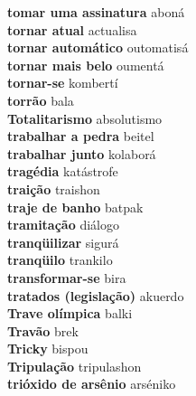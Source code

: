 \textbf{ tomar uma assinatura  } aboná \\
\textbf{ tornar atual  } actualisa \\
\textbf{ tornar automático  } outomatisá \\
\textbf{ tornar mais belo  } oumentá \\
\textbf{ tornar-se  } kombertí \\
\textbf{ torrão  } bala \\
\textbf{ Totalitarismo  } absolutismo \\
\textbf{ trabalhar a pedra  } beitel \\
\textbf{ trabalhar junto  } kolaborá \\
\textbf{ tragédia  } katástrofe \\
\textbf{ traição  } traishon \\
\textbf{ traje de banho  } batpak \\
\textbf{ tramitação  } diálogo \\
\textbf{ tranqüilizar  } sigurá \\
\textbf{ tranqüilo  } trankilo \\
\textbf{ transformar-se  } bira \\
\textbf{ tratados (legislação)  } akuerdo \\
\textbf{ Trave olímpica  } balki \\
\textbf{ Travão  } brek \\
\textbf{ Tricky  } bispou \\
\textbf{ Tripulação  } tripulashon \\
\textbf{ trióxido de arsênio  } arséniko \\
